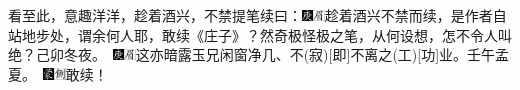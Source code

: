 {看至此，意趣洋洋，趁着酒兴，不禁提笔续曰：{{\includegraphics[width=3mm]{../Images/00004}\includegraphics[width=3mm]{../Images/00010}\footnotesize \kaishu 趁着酒兴不禁而续，是作者自站地步处，谓余何人耶，敢续《庄子》？然奇极怪极之笔，从何设想，怎不令人叫绝？己卯冬夜。　\includegraphics[width=3mm]{../Images/00004}\includegraphics[width=3mm]{../Images/00010}\footnotesize \kaishu 这亦暗露玉兄闲窗净几、不{(寂)}{[}即{]}不离之{(工)}{[}功{]}业。壬午孟夏。　}\includegraphics[width=3mm]{../Images/00006}\includegraphics[width=3mm]{../Images/00011}\footnotesize \kaishu 敢续！}

}
